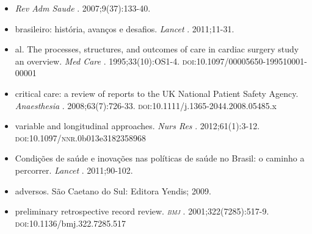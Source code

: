 \documentclass{article}
\begin{document}
\begin{itemize}
\item[%
15] %
\textit{Rev
            Adm Saude}
 . 2007;9(37):133-40.  

\item[%
16] %
          brasileiro: história, avanços e desafios. %
\textit{Lancet}
 .
          2011;11-31.  

\item[%
17] %
          al. The processes, structures, and outcomes of care in cardiac surgery study an overview.
\textit{Med Care}
 . 1995;33(10):OS1-4.
          \textsc{doi}:10.1097/00005650-199510001-00001  

\item[%
18] %
          critical care: a review of reports to the UK National Patient Safety Agency.
\textit{Anaesthesia}
 . 2008;63(7):726-33.
          \textsc{doi}:10.1111/j.1365-2044.2008.05485.x  

\item[%
19] %
          variable and longitudinal approaches. %
\textit{Nurs Res}
 . 2012;61(1):3-12.
          \textsc{doi}:10.1097/\textsc{nnr}.0b013e3182358968  

\item[%
20] %
          Condições de saúde e inovações nas políticas de saúde no Brasil: o caminho a percorrer.
\textit{Lancet}
 . 2011;90-102.  

\item[%
21] %
          adversos. São Caetano do Sul: Editora Yendis; 2009.  

\item[%
22] %
          preliminary retrospective record review. %
\textit{\textsc{bmj}}
 . 2001;322(7285):517-9.
          \textsc{doi}:10.1136/bmj.322.7285.517  


\end{itemize}
\end{document}
